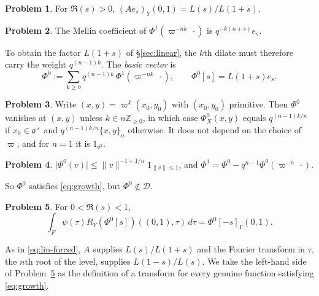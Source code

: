 \documentclass[reqno]{amsart}
\newcommand{\Dc}{\mathcal{D}}
\newcommand{\oo}{\mathfrak{o}}
\numberwithin{equation}{section}
\theoremstyle{definition}
\newtheorem{problem}{Problem}[section]
\theoremstyle{plain}
\begin{document}
\begin{problem}\label{pr:spherical-axis}
  For $\Re(s) > 0$, $(A e_s)_Y(0, 1) = L(s) / L(1 + s)$.
\end{problem}

\begin{problem}\label{pr:basic-weights}
  The Mellin coefficient of $\Phi^1(\varpi^{-n k} \, \cdot)$ is $q^{-k (n + s)} e_s$.
\end{problem}

To obtain the factor $L(1 + s)$ of \S\ref{sec:linear}, the $k$th dilate must therefore carry the weight $q^{(n-1) k}$.  The \emph{basic vector} is
\begin{equation*}
  \Phi^0 := \sum_{k \geq 0} q^{(n-1) k} \, \Phi^1(\varpi^{-n k} \, \cdot),
  \qquad
  \Phi^0[s] = L(1 + s) e_s.
\end{equation*}

\begin{problem}\label{pr:basic-explicit}
  Write $(x, y) = \varpi^k (x_0, y_0)$ with $(x_0, y_0)$ primitive.  Then $\Phi^0$ vanishes at $(x, y)$ unless $k \in n \mathbb{Z}_{\geq 0}$, in which case $\Phi^0_X(x, y)$ equals $q^{(n-1) k / n}$ if $x_0 \in \oo^\times$ and $q^{(n-1) k / n} \{x, y\}_n$ otherwise.  It does not depend on the choice of $\varpi$, and for $n = 1$ it is $1_{\oo^2}$.
\end{problem}

\begin{problem}\label{pr:basic-layer}
  $\lvert \Phi^0(v) \rvert \leq \lVert v \rVert^{-1 + 1/n} 1_{\lVert v \rVert \leq 1}$, and $\Phi^1 = \Phi^0 - q^{n-1} \Phi^0(\varpi^{-n} \, \cdot)$.
\end{problem}

So $\Phi^0$ satisfies \eqref{eq:growth}, but $\Phi^0 \notin \Dc$.

\begin{problem}\label{pr:forced}
  For $0 < \Re(s) < 1$,
  \begin{equation*}
    \int_F \psi(\tau) R_Y(\Phi^0[s])((0, 1), \tau) \, d \tau = \Phi^0[-s]_Y(0, 1).
  \end{equation*}
\end{problem}

As in \eqref{eq:lin-forced}, $A$ supplies $L(s) / L(1 + s)$ and the Fourier transform in $\tau$, the $n$th root of the level, supplies $L(1 - s) / L(s)$.  We take the left-hand side of Problem~\ref{pr:forced} as the definition of a transform for every genuine function satisfying \eqref{eq:growth}.

\end{document}
